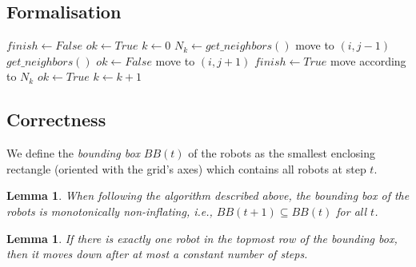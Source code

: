 \documentclass[11pt, a4paper]{article}
\theoremstyle{plain}
\newtheorem{lem}[thm]{Lemma}
\theoremstyle{definition}
\theoremstyle{remark}
\begin{document}
\subsection{Formalisation}
\begin{algorithm}[H]
  $finish \leftarrow False$\;
  $ok \leftarrow True$\;
  $k \leftarrow 0$\;
   {
    $N_k \leftarrow get\_neighbors()$\;
     {
       {
        move to $(i, j-1)$\;
        $get\_neighbors()$\;
         {
          $ok \leftarrow False$\;
        }
      }
    }
     {
       {
        move to $(i, j+1)$\;
      }
    }
     {
       {
          $finish \leftarrow True$\;
      }
       {
        move according to $N_k$\;
      }
      $ok \leftarrow True$\;
    }
    $k \leftarrow k+1$\;
  }
  \caption{}
\end{algorithm}

\subsection{Correctness}

We define the \textit{bounding box} $BB(t)$ of the robots as the smallest
enclosing rectangle (oriented with the grid's axes) which contains all robots
at step $t$.

\begin{lem}
When following the algorithm described above, the bounding box of the robots is
monotonically non-inflating, i.e., $BB(t+1) \subseteq BB(t)$ for all $t$.
\end{lem}

\begin{lem}
If there is exactly one robot in the topmost row of the bounding box, then it
moves down after at most a constant number of steps.
\end{lem}
\end{document}
